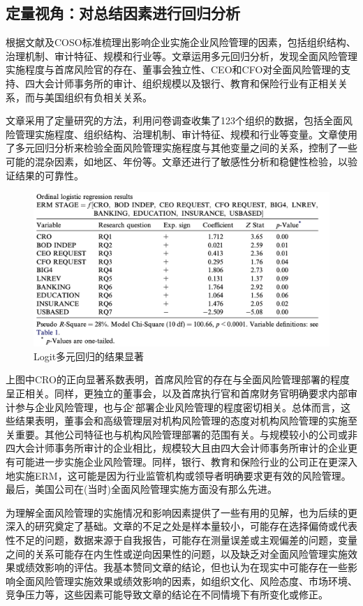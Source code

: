 \documentclass[a4paper,12pt]{ctexart}
\begin{document}
\subsection{定量视角：对总结因素进行回归分析}
\citet{beasley2005enterprise}根据文献及COSO标准梳理出影响企业实施企业风险管理的因素，包括组织结构、治理机制、审计特征、规模和行业等。文章运用多元回归分析，发现全面风险管理实施程度与首席风险官的存在、董事会独立性、CEO和CFO对全面风险管理的支持、四大会计师事务所的审计、组织规模以及银行、教育和保险行业有正相关关系，而与美国组织有负相关关系。

文章采用了定量研究的方法，利用问卷调查收集了123个组织的数据，包括全面风险管理实施程度、组织结构、治理机制、审计特征、规模和行业等变量。文章使用了多元回归分析来检验全面风险管理实施程度与其他变量之间的关系，控制了一些可能的混杂因素，如地区、年份等。文章还进行了敏感性分析和稳健性检验，以验证结果的可靠性。
\begin{figure}[H]
    \caption{Logit多元回归的结果显著}
    \centering
    \includegraphics[width=\linewidth]{img/logits.png}
\end{figure}

上图中CRO的正向显著系数表明，首席风险官的存在与全面风险管理部署的程度呈正相关。同样，更独立的董事会，以及首席执行官和首席财务官明确要求内部审计参与企业风险管理，也与企业̃部署企业风险管理的程度密切相关。总体而言，这些结果表明，董事会和高级管理层对机构风险管理的态度对机构风险管理的实施至关重要。其他公司特征也与机构风险管理部署的范围有关。与规模较小的公司或非四大会计师事务所审计的企业相比，规模较大且由四大会计师事务所审计的企业更有可能进一步实施企业风险管理。同样，银行、教育和保险行业的公司正在更深入地实施ERM，这可能是因为行业监管机构或领导者明确要求更有效的风险管理。最后，美国公司在(当时)全面风险管理实施方面没有那么先进。

\citet{beasley2005enterprise}为理解全面风险管理的实施情况和影响因素提供了一些有用的见解，也为后续的更深入的研究奠定了基础。文章的不足之处是样本量较小，可能存在选择偏倚或代表性不足的问题，数据来源于自我报告，可能存在测量误差或主观偏差的问题，变量之间的关系可能存在内生性或逆向因果性的问题，以及缺乏对全面风险管理实施效果或绩效影响的评估。我基本赞同文章的结论，但也认为在现实中可能存在一些影响全面风险管理实施效果或绩效影响的因素，如组织文化、风险态度、市场环境、竞争压力等，这些因素可能导致文章的结论在不同情境下有所变化或修正。
\end{document}
